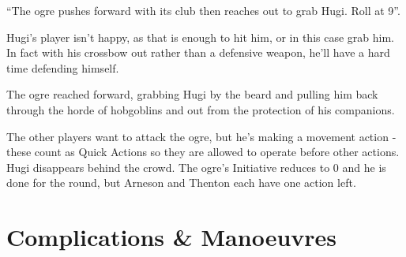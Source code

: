\begin{multicols}{2}
{\begin{exampletext}
	``The ogre pushes forward with its club then reaches out to grab Hugi. Roll at  9''.

	Hugi's player isn't happy, as that is enough to hit him, or in this case grab him. In fact with his crossbow out rather than a defensive weapon, he'll have a hard time defending himself.

	The ogre reached forward, grabbing Hugi by the beard and pulling him back through the horde of hobgoblins and out from the protection of his companions.

	The other players want to attack the ogre, but he's making a movement action - these count as Quick Actions so they are allowed to operate before other actions.
	Hugi disappears behind the crowd.
	The ogre's Initiative reduces to 0 and he is done for the \gls{round}, but Arneson and Thenton each have one action left.

\end{exampletext}

}{}

\end{multicols}

\section{Complications \& Manoeuvres}


